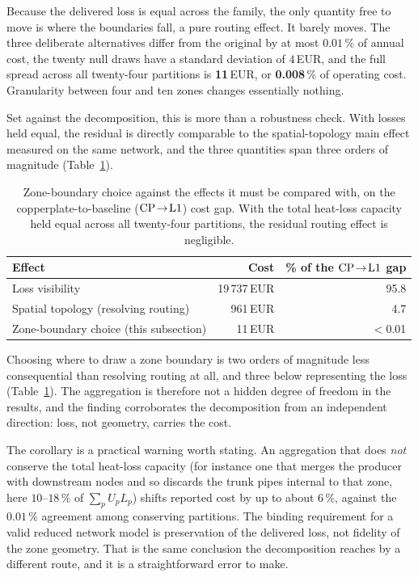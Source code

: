 Because the delivered loss is equal across the family, the only quantity free to move is
where the boundaries fall, a pure routing effect. It barely moves. The three deliberate
alternatives differ from the original by at most $0.01$\,\% of annual cost, the twenty null
draws have a standard deviation of $4$\,EUR, and the full spread across all twenty-four
partitions is \textbf{11}\,EUR, or \textbf{0.008}\,\% of operating cost. Granularity between
four and ten zones changes essentially nothing.

Set against the decomposition, this is more than a robustness check. With losses held
equal, the residual is directly comparable to the spatial-topology main effect measured on
the same network, and the three quantities span three orders of magnitude
(Table~\ref{tab:r16}).

\begin{table}[htbp]
\centering
\footnotesize
\caption{Zone-boundary choice against the effects it must be compared with, on the
copperplate-to-baseline ($\mathrm{CP}\!\to\!\mathrm{L1}$) cost gap. With the total heat-loss capacity held
equal across all twenty-four partitions, the residual routing effect is negligible.}
\label{tab:r16}
\begin{tabular}{lrr}
\hline
Effect & Cost & \% of the $\mathrm{CP}\!\to\!\mathrm{L1}$ gap \\
\hline
Loss visibility & 19\,737\,EUR & 95.8 \\
Spatial topology (resolving routing) & 961\,EUR & 4.7 \\
Zone-boundary choice (this subsection) & 11\,EUR & $<$0.01 \\
\hline
\end{tabular}
\end{table}

Choosing where to draw a zone boundary is two orders of magnitude less consequential than
resolving routing at all, and three below representing the loss
(Table~\ref{tab:r16}). The aggregation is therefore not a hidden degree
of freedom in the results, and the finding corroborates the decomposition from an
independent direction: loss, not geometry, carries the cost.

The corollary is a practical warning worth stating. An aggregation that does \emph{not}
conserve the total heat-loss capacity (for instance one that merges the producer with
downstream nodes and so discards the trunk pipes internal to that zone, here $10$--$18$\,\%
of $\sum_p U_p L_p$) shifts reported cost by up to about $6$\,\%, against the $0.01$\,\%
agreement among conserving partitions. The binding requirement for a valid reduced network
model is preservation of the delivered loss, not fidelity of the zone geometry. That is the
same conclusion the decomposition reaches by a different route, and it is a straightforward
error to make.

